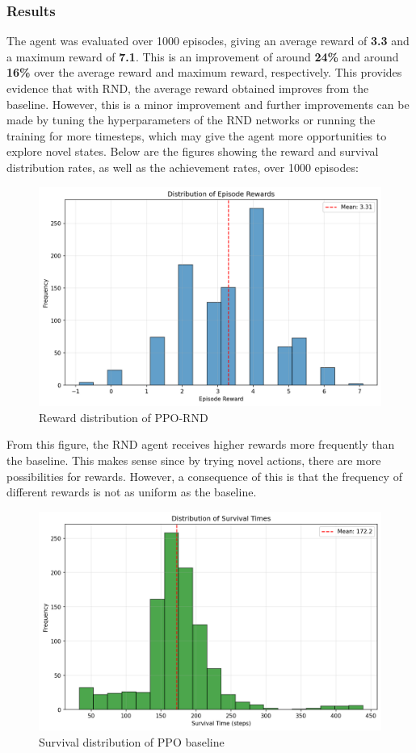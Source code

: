 \documentclass[twocolumn]{article}
\begin{document}
\subsubsection*{Results}
The agent was evaluated over 1000 episodes, giving an average reward of \textbf{3.3} and a maximum reward of \textbf{7.1}. This is an improvement of around \textbf{24\%} and around \textbf{16\%} over the average reward and maximum reward, respectively. This provides evidence that with RND, the average reward obtained improves from the baseline. However, this is a minor improvement and further improvements can be made by tuning the hyperparameters of the RND networks or running the training for more timesteps, which may give the agent more opportunities to explore novel states. Below are the figures showing the reward and survival distribution rates, as well as the achievement rates, over 1000 episodes:
\begin{figure}[H]
    \centering
    \includegraphics[width=0.75\linewidth]{images/reward_distribution_ppo_improv1_1000_episodes.png}
    \caption{Reward distribution of PPO-RND}
    \label{fig:placeholder}
\end{figure}
From this figure, the RND agent receives higher rewards more frequently than the baseline. This makes sense since by trying novel actions, there are more possibilities for rewards. However, a consequence of this is that the frequency of different rewards is not as uniform as the baseline.
\begin{figure}[H]
    \centering
    \includegraphics[width=0.75\linewidth]{images/survival_distribution_ppo_improv1_1000_episodes.png}
    \caption{Survival distribution of PPO baseline}
    \label{fig:placeholder}
\end{figure}
\end{document}

